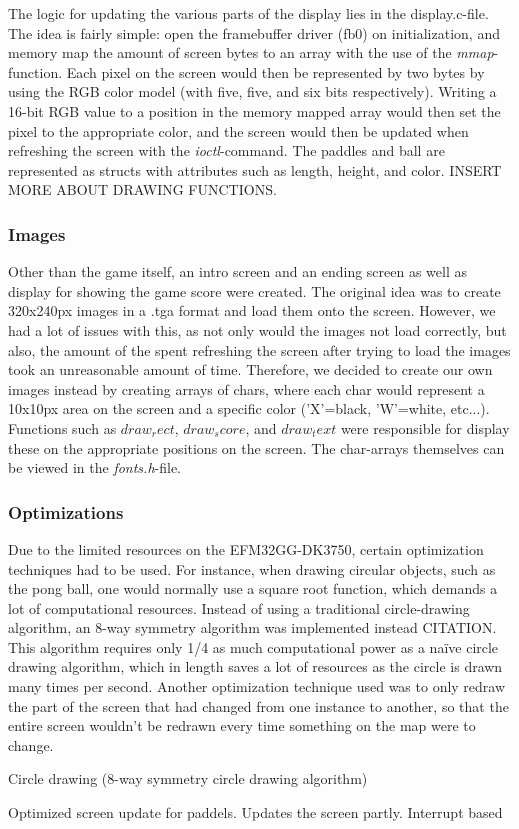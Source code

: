 The logic for updating the various parts of the display lies in the display.c-file. The idea is fairly simple: open the framebuffer driver (fb0) on initialization, and memory map the amount of screen bytes to an array with the use of the \emph{mmap}-function. Each pixel on the screen would then be represented by two bytes by using the RGB color model (with five, five, and six bits respectively). Writing a 16-bit RGB value to a position in the memory mapped array would then set the pixel to the appropriate color, and the screen would then be updated when refreshing the screen with the \emph{ioctl}-command. The paddles and ball are represented as structs with attributes such as length, height, and color. INSERT MORE ABOUT DRAWING FUNCTIONS.

\subsubsection{Images}

Other than the game itself, an intro screen and an ending screen as well as display for showing the game score were created. The original idea was to create 320x240px images in a .tga format and load them onto the screen. However, we had a lot of issues with this, as not only would the images not load correctly, but also, the amount of the spent refreshing the screen after trying to load the images took an unreasonable amount of time. Therefore, we decided to create our own images instead by creating arrays of chars, where each char would represent a 10x10px area on the screen and a specific color ('X'=black, 'W'=white, etc...). Functions such as \emph{$draw_rect$}, \emph{$draw_score$}, and \emph{$draw_text$} were responsible for display these on the appropriate positions on the screen. The char-arrays themselves can be viewed in the \emph{fonts.h}-file.


\subsubsection{Optimizations}

Due to the limited resources on the EFM32GG-DK3750, certain optimization techniques had to be used. For instance, when drawing circular objects, such as the pong ball, one would normally use a square root function, which demands a lot of computational resources. Instead of using a traditional circle-drawing algorithm, an 8-way symmetry algorithm was implemented instead CITATION. This algorithm requires only 1/4 as much computational power as a naïve circle drawing algorithm, which in length saves a lot of resources as the circle is drawn many times per second.
	Another optimization technique used was to only redraw the part of the screen that had changed from one instance to another, so that the entire screen wouldn't be redrawn every time something on the map were to change.  

Circle drawing (8-way symmetry circle drawing algorithm)

Optimized screen update for paddels. Updates the screen partly. Interrupt based 
